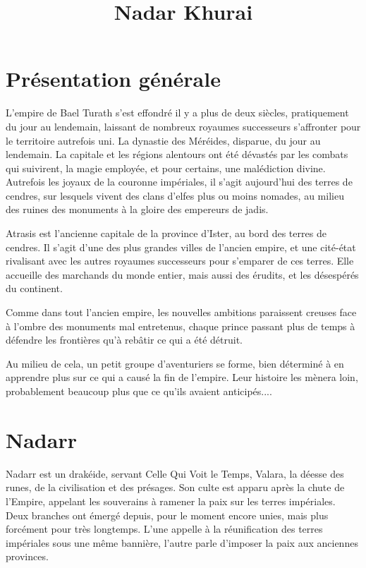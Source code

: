 \documentclass[10pt,a4paper]{article}
\title{Nadar Khurai}
\author{}
\begin{document}
\maketitle
\section{Présentation générale}
L'empire de Bael Turath s'est effondré il y a plus de deux siècles, pratiquement du jour au lendemain, laissant de nombreux royaumes successeurs s'affronter pour le territoire autrefois uni. La dynastie des Méréides, disparue, du jour au lendemain. La capitale et les régions alentours ont été dévastés par les combats qui suivirent, la magie employée, et pour certains, une malédiction divine. Autrefois les joyaux de la couronne impériales, il s'agit aujourd'hui des terres de cendres, sur lesquels vivent des clans d'elfes plus ou moins nomades, au milieu des ruines des monuments à la gloire des empereurs de jadis.

Atrasis est l'ancienne capitale de la province d'Ister, au bord des terres de cendres. Il s'agit d'une des plus grandes villes de l'ancien empire, et une cité-état rivalisant avec les autres royaumes successeurs pour s'emparer de ces terres. Elle accueille des marchands du monde entier, mais aussi des érudits, et les désespérés du continent.

Comme dans tout l'ancien empire, les nouvelles ambitions paraissent creuses face à l'ombre des monuments mal entretenus, chaque prince passant plus de temps à défendre les frontières qu'à rebâtir ce qui a été détruit.

Au milieu de cela, un petit groupe d'aventuriers se forme, bien déterminé à en apprendre plus sur ce qui a causé la fin de l'empire. Leur histoire les mènera loin, probablement beaucoup plus que ce qu'ils avaient anticipés....
\section{Nadarr}
Nadarr est un drakéide, servant Celle Qui Voit le Temps, Valara, la déesse des runes, de la civilisation et des présages. Son culte est apparu après la chute de l'Empire, appelant les souverains à ramener la paix sur les terres impériales. Deux branches ont émergé depuis, pour le moment encore unies, mais plus forcément pour très longtemps. L'une appelle à la réunification des terres impériales sous une même bannière, l'autre parle d'imposer la paix aux anciennes provinces.
\end{document}
